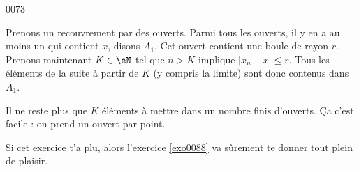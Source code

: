 
\begin{corrige}{0073}

Prenons un recouvrement par des ouverts. Parmi tous les ouverts, il y en a au moins un qui contient $x$, disons $A_1$. Cet ouvert contient une boule de rayon $r$. Prenons maintenant $K\in\eN$ tel que $n>K$ implique $| x_n-x |\leq r$. Tous les éléments de la suite à partir de $K$ (y compris la limite) sont donc contenus dans $A_1$.

Il ne reste plus que $K$ éléments à mettre dans un nombre finis d'ouverts. Ça c'est facile : on prend un ouvert par point.

Si cet exercice t'a plu, alors l'exercice \ref{exo0088} va sûrement te donner tout plein de plaisir.

\end{corrige}
